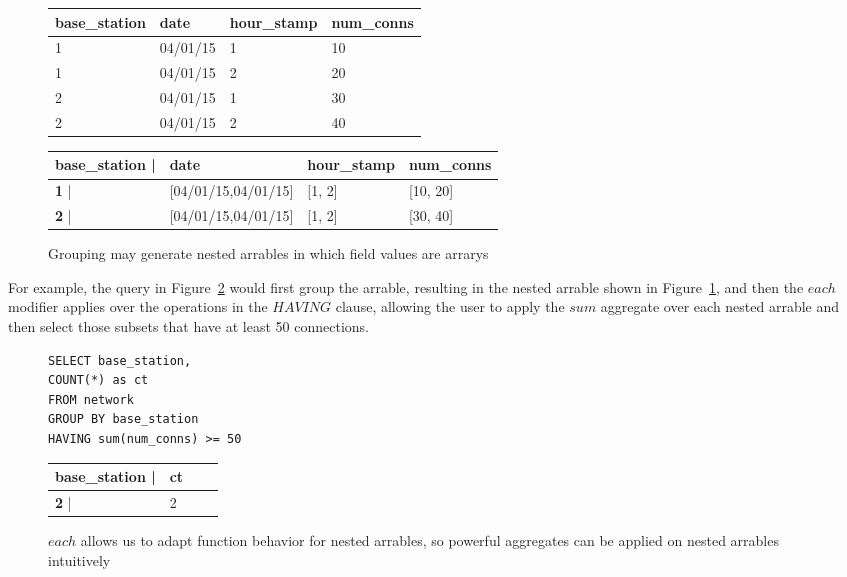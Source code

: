 \documentclass{acm_proc_article-sp}
\begin{document}
\begin{figure}[]
\centering
\begin{tabular}{@{}llll@{}}
\toprule
base\_station & date     & hour\_stamp & num\_conns \\ \midrule
1             & 04/01/15 & 1           & 10               \\
1             & 04/01/15 & 2           & 20               \\
2             & 04/01/15 & 1           & 30               \\
2             & 04/01/15 & 2           & 40               \\ \bottomrule
\end{tabular}
\small{
\begin{tabular}{@{}llll@{}}
\toprule
\textbf{base\_station} |& date     & hour\_stamp & num\_conns \\ \midrule
\textbf{1}             |& [04/01/15,04/01/15] & [1, 2]          & [10, 20]               \\
\textbf{2}             |& [04/01/15,04/01/15] & [1, 2]           & [30, 40]            \\ \bottomrule
\end{tabular}
}
\caption{Grouping may generate nested arrables in which field values
are arrarys}
\label{group-by}
\end{figure}

 For example, the query in Figure~\ref{each-example} would first group the arrable, resulting in the nested arrable shown in Figure~\ref{group-by}, and then the $each$ modifier applies over the operations in the $HAVING$ clause, 
 allowing the user to apply the $sum$ aggregate over each nested arrable and then select those subsets that have at least 50 connections.

\begin{figure}[]
\centering
\begin{lstlisting}
SELECT base_station,
COUNT(*) as ct
FROM network
GROUP BY base_station
HAVING sum(num_conns) >= 50
\end{lstlisting}
\small{
\begin{tabular}{@{}llll@{}}
\toprule
\textbf{base\_station} |& ct \\ \midrule
\textbf{2}             |& 2            \\ \bottomrule
\end{tabular}
}
\caption{$each$ allows us to adapt function behavior for nested arrables, so powerful aggregates can be applied on nested arrables intuitively}
\label{each-example}
\end{figure}
\end{document}

